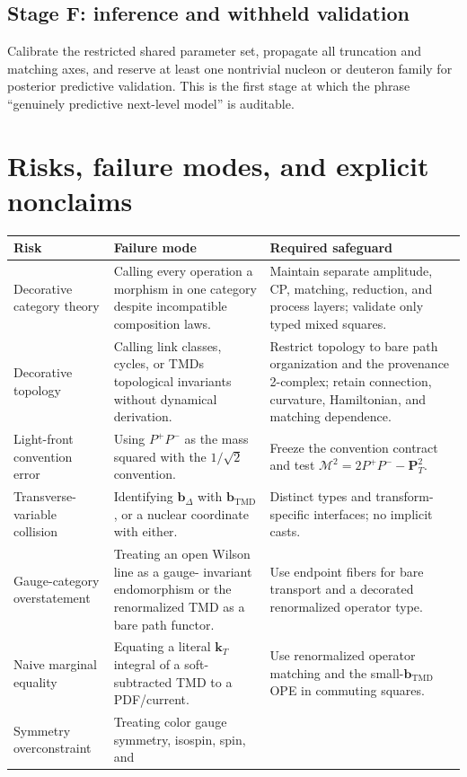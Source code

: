 \documentclass[11pt]{article}
\newcommand{\kT}{\bm{k}_{T}}
\newcommand{\bD}{\bm{b}_{\Delta}}
\newcommand{\bM}{\bm{b}_{\mathrm{TMD}}}
\newcommand{\cM}{\mathcal M}
\begin{document}
\subsection{Stage F: inference and withheld validation}

Calibrate the restricted shared parameter set, propagate all truncation and
matching axes, and reserve at least one nontrivial nucleon or deuteron family
for posterior predictive validation.  This is the first stage at which the
phrase ``genuinely predictive next-level model'' is auditable.

\section{Risks, failure modes, and explicit nonclaims}
\label{sec:risks}

\begin{longtable}{L{0.22\textwidth}L{0.34\textwidth}L{0.36\textwidth}}
\toprule
Risk & Failure mode & Required safeguard\\
\midrule
\endhead
Decorative category theory & Calling every operation a morphism in one
category despite incompatible composition laws. & Maintain separate amplitude,
CP, matching, reduction, and process layers; validate only typed mixed
squares.\\
Decorative topology & Calling link classes, cycles, or TMDs topological
invariants without dynamical derivation. & Restrict topology to bare path
organization and the provenance 2-complex; retain connection, curvature,
Hamiltonian, and matching dependence.\\
Light-front convention error & Using \(P^+P^-\) as the mass squared with the
\(1/\sqrt2\) convention. & Freeze the convention contract and test
\(\cM^2=2P^+P^- -\bm P_T^2\).\\
Transverse-variable collision & Identifying \(\bD\) with \(\bM\), or a
nuclear coordinate with either. & Distinct types and transform-specific
interfaces; no implicit casts.\\
Gauge-category overstatement & Treating an open Wilson line as a gauge-
invariant endomorphism or the renormalized TMD as a bare path functor. & Use
endpoint fibers for bare transport and a decorated renormalized operator type.\\
Naive marginal equality & Equating a literal \(\kT\) integral of a
soft-subtracted TMD to a PDF/current. & Use renormalized operator matching and
the small-\(\bM\) OPE in commuting squares.\\
Symmetry overconstraint & Treating color gauge symmetry, isospin, spin, and

\end{longtable}
\end{document}
